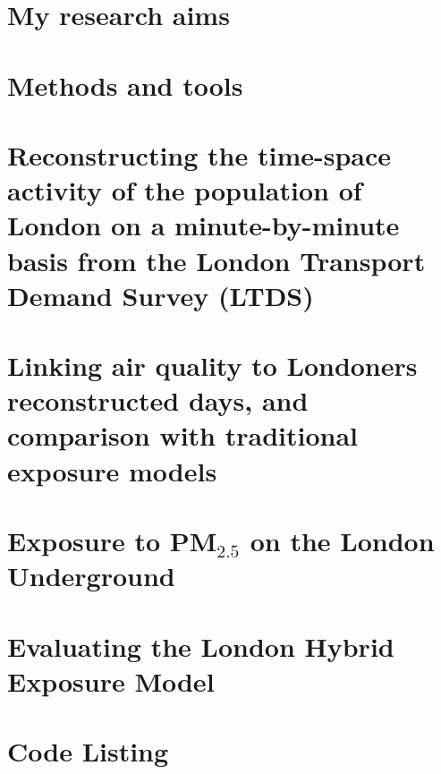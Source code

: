 \documentclass[12pt]{report}
\begin{document}
\chapter{My research aims}


\chapter{Methods and tools}


\chapter{Reconstructing the  time-space activity of the population of London on a minute-by-minute basis from the London Transport Demand Survey (LTDS)}


\chapter{Linking air quality to Londoners reconstructed days, and comparison with traditional exposure models}


\chapter{Exposure to \texorpdfstring{PM$_{2.5}$}{} on the London Underground}
\label{chap:monitoring_on_underground}


\chapter{Evaluating the London Hybrid Exposure Model}





\appendix

\chapter{Code Listing}

\end{document}

